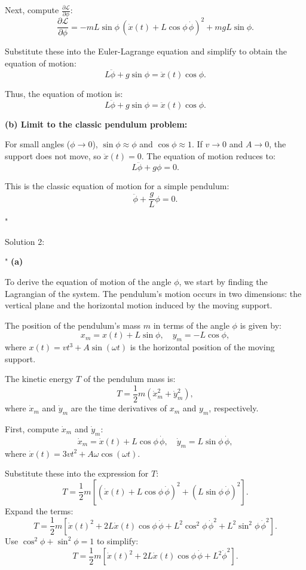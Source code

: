 Next, compute $\frac{\partial \mathcal{L}}{\partial \phi}$:
\[
\frac{\partial \mathcal{L}}{\partial \phi} = -mL\sin\phi \, \left(\dot{x}(t) + L\cos\phi \, \dot{\phi}\right)^2 + mgL\sin\phi.
\]

Substitute these into the Euler-Lagrange equation and simplify to obtain the equation of motion:
\[
L\ddot{\phi} + g\sin\phi = \ddot{x}(t)\cos\phi.
\]

Thus, the equation of motion is:
\[
\boxed{L\ddot{\phi} + g\sin\phi = \ddot{x}(t)\cos\phi.}
\]

\textbf{(b) Limit to the classic pendulum problem:}

For small angles ($\phi \to 0$), $\sin\phi \approx \phi$ and $\cos\phi \approx 1$. If $v \to 0$ and $A \to 0$, the support does not move, so $\ddot{x}(t) = 0$. The equation of motion reduces to:
\[
L\ddot{\phi} + g\phi = 0.
\]

This is the classic equation of motion for a simple pendulum:
\[
\boxed{\ddot{\phi} + \frac{g}{L}\phi = 0.}
\]

"

Solution 2: 

"
\textbf{(a)} 

To derive the equation of motion of the angle $\phi$, we start by finding the Lagrangian of the system. The pendulum's motion occurs in two dimensions: the vertical plane and the horizontal motion induced by the moving support. 

The position of the pendulum's mass $m$ in terms of the angle $\phi$ is given by:
\[
x_m = x(t) + L\sin\phi, \quad y_m = -L\cos\phi,
\]
where $x(t) = vt^3 + A\sin(\omega t)$ is the horizontal position of the moving support.

The kinetic energy $T$ of the pendulum mass is:
\[
T = \frac{1}{2}m\left(\dot{x}_m^2 + \dot{y}_m^2\right),
\]
where $\dot{x}_m$ and $\dot{y}_m$ are the time derivatives of $x_m$ and $y_m$, respectively.

First, compute $\dot{x}_m$ and $\dot{y}_m$:
\[
\dot{x}_m = \dot{x}(t) + L\cos\phi\,\dot{\phi}, \quad \dot{y}_m = L\sin\phi\,\dot{\phi},
\]
where $\dot{x}(t) = 3vt^2 + A\omega\cos(\omega t)$.

Substitute these into the expression for $T$:
\[
T = \frac{1}{2}m\left[\left(\dot{x}(t) + L\cos\phi\,\dot{\phi}\right)^2 + \left(L\sin\phi\,\dot{\phi}\right)^2\right].
\]
Expand the terms:
\[
T = \frac{1}{2}m\left[\dot{x}(t)^2 + 2L\dot{x}(t)\cos\phi\,\dot{\phi} + L^2\cos^2\phi\,\dot{\phi}^2 + L^2\sin^2\phi\,\dot{\phi}^2\right].
\]
Use $\cos^2\phi + \sin^2\phi = 1$ to simplify:
\[
T = \frac{1}{2}m\left[\dot{x}(t)^2 + 2L\dot{x}(t)\cos\phi\,\dot{\phi} + L^2\dot{\phi}^2\right].
\]

